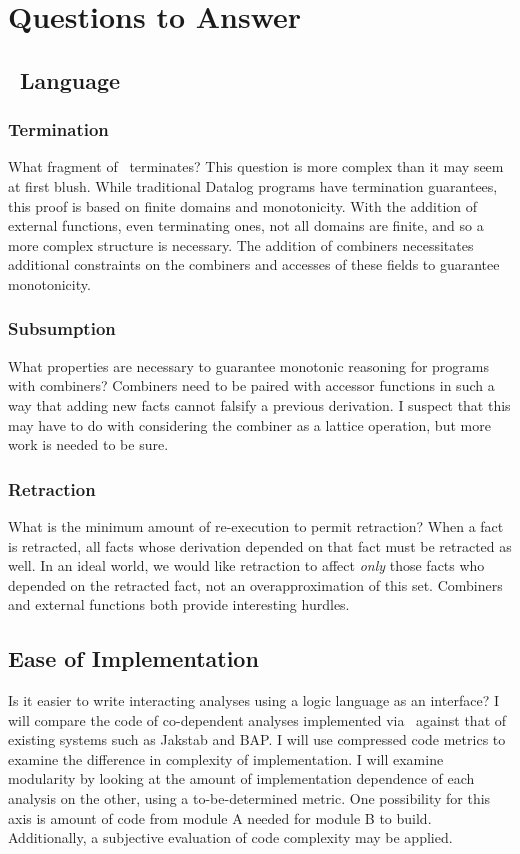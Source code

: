 \section{Questions to Answer}
\subsection{\sysname\ Language}
\subsubsection{Termination}
What fragment of \sysname\ terminates?
This question is more complex than it may seem at first blush.
While traditional Datalog programs have termination guarantees, this proof is based on finite domains and monotonicity.
With the addition of external functions, even terminating ones, not all domains are finite, and so a more complex structure is necessary.
The addition of combiners necessitates additional constraints on the combiners and accesses of these fields to guarantee monotonicity.
\subsubsection{Subsumption}
What properties are necessary to guarantee monotonic reasoning for programs with combiners?
Combiners need to be paired with accessor functions in such a way that adding new facts cannot falsify a previous derivation.
I suspect that this may have to do with considering the combiner as a lattice operation, but more work is needed to be sure.
\subsubsection{Retraction}
What is the minimum amount of re-execution to permit retraction?
When a fact is retracted, all facts whose derivation depended on that fact must be retracted as well.
In an ideal world, we would like retraction to affect \emph{only} those facts who depended on the retracted fact, not an overapproximation of this set.
Combiners and external functions both provide interesting hurdles.
\subsection{Ease of Implementation}
Is it easier to write interacting analyses using a logic language as an interface?
I will compare the code of co-dependent analyses implemented via \sysname\ against that of existing systems such as Jakstab and BAP.
I will use compressed code metrics to examine the difference in complexity of implementation.
I will examine modularity by looking at the amount of implementation dependence of each analysis on the other, using a to-be-determined metric.
One possibility for this axis is amount of code from module A needed for module B to build.
Additionally, a subjective evaluation of code complexity may be applied.
